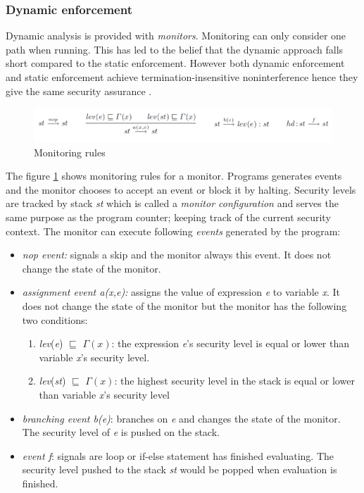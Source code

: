 \subsubsection{Dynamic enforcement}
Dynamic analysis is provided with \emph{monitors}. Monitoring can only consider one path when running. This has led to the belief that the dynamic approach falls short compared to the static enforcement. However both dynamic enforcement and static enforcement achieve termination-insensitive noninterference hence they give the same security assurance \cite{Sabelfeld2010}. 

\begin{figure}[H]
	\centering
	\includegraphics[width=12cm]{figures/monitoringrules.png}
	\caption{ Monitoring rules \cite{Sabelfeld2010}}
	\label{fig:monitoring}
\end{figure}

The figure \ref{fig:monitoring} shows monitoring rules for a monitor. Programs generates events and the monitor chooses to accept an event or block it by halting. Security levels are tracked by stack \emph{st} which is called a \emph{monitor configuration} and serves the same purpose as the program counter; keeping track of the current security context.  The monitor can execute following \emph{events} generated by the program: 

\begin{itemize}
	\item \emph{nop event:} signals a skip and the monitor always this event. It does not change the state of the monitor.
	\item \emph{assignment event a(x,e):} assigns the value of expression \emph{e} to variable \emph{x}. It does not change the state of the monitor but the monitor has the following two conditions:
	\begin{enumerate}
		\item \emph{lev}(\emph{e}) $\sqsubseteq$ $\Gamma(x)$: the expression \emph{e}'s security level is equal or lower than variable \emph{x}'s security level.
		\item \emph{lev}(\emph{st}) $\sqsubseteq$ $\Gamma(x)$: the highest security level in the stack is equal or lower than variable \emph{x}'s security level 
	\end{enumerate} 
	\item \emph{branching event b(e)}: branches on \emph{e} and changes the state of the monitor. The security level of \emph{e} is pushed on the stack.
	\item \emph{event f}: signals are loop or if-else statement has finished evaluating. The security level pushed to the stack \emph{st} would be popped when evaluation is finished.
\end{itemize}

